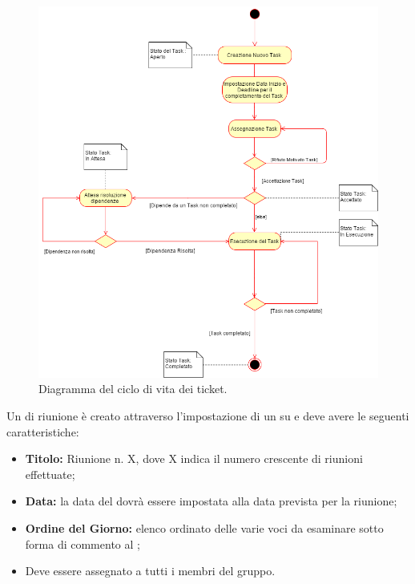 \documentclass[12pt,a4paper]{article}
\begin{document}
\begin{center}
	\begin{figure}[H]
		\centering
		\label{f1-TicketCicloVita}
		\includegraphics[scale=0.6]{TicketCicloVita.png}
		\caption{Diagramma del ciclo di vita dei ticket.}
	\end{figure}
\end{center}

\label{ticketRiunione}
Un  di riunione è creato attraverso l'impostazione di un  su  e deve avere le seguenti caratteristiche:
\begin{itemize}
	\item \textbf{Titolo:} Riunione n. X, dove X indica il numero crescente di riunioni effettuate;
	\item \textbf{Data:} la data del  dovrà essere impostata alla data prevista per la riunione;
	\item \textbf{Ordine del Giorno:} elenco ordinato delle varie voci da esaminare sotto forma di commento al ;
	\item Deve essere assegnato a tutti i membri del gruppo.
\end{itemize}
\end{document}
